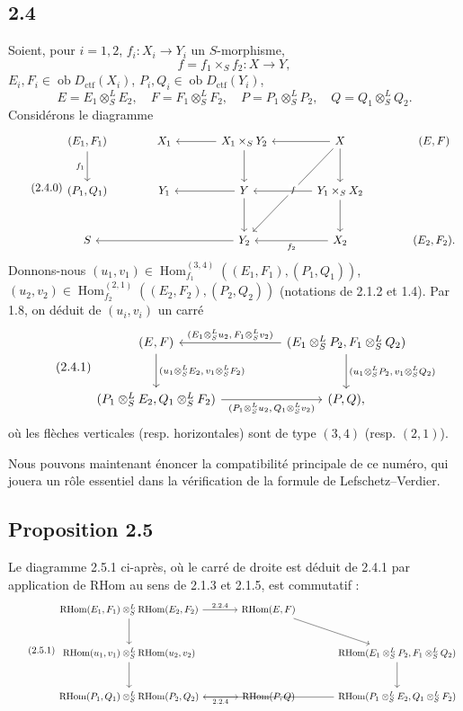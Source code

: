 \documentclass[11pt]{article}
\DeclareMathOperator{\Hom}{Hom}
\newcommand{\ob}{\operatorname{ob}}
\providecommand{\RHom}{\mathrm{RHom}}
\providecommand{\ctf}{\mathrm{ctf}}
\providecommand{\RHom}{\mathrm{RHom}}
\providecommand{\Hom}{\operatorname{Hom}}
\providecommand{\ob}{\operatorname{ob}}
\providecommand{\RHom}{\mathrm R\mathcal{H}om}
\providecommand{\RHom}{\mathrm{RHom}}
\providecommand{\Hom}{\operatorname{Hom}}
\begin{document}
\subsection*{2.4}
Soient, pour $i=1,2$, $f_i:X_i\to Y_i$ un $S$-morphisme,
\[
f=f_1\times_S f_2:X\to Y,
\]
$E_i,F_i\in\ob D_{\ctf}(X_i)$, $P_i,Q_i\in\ob D_{\ctf}(Y_i)$,
\[
E=E_1\otimes^{L}_{S}E_2,
\quad F=F_1\otimes^{L}_{S}F_2,
\quad P=P_1\otimes^{L}_{S}P_2,
\quad Q=Q_1\otimes^{L}_{S}Q_2.
\]
Considérons le diagramme
\begin{equation}\tag{2.4.0}
\begin{tikzcd}[column sep=large,row sep=large]
(E_1,F_1) \arrow[d,"f_1"'] & X_1 & X_1\times_SY_2 \arrow[l] \arrow[d] & X \arrow[l] \arrow[d] \arrow[ddl,"f" description] & (E,F)\\
(P_1,Q_1) & Y_1 & Y \arrow[l] \arrow[d] & Y_1\times_SX_2 \arrow[l] \arrow[d] \\
S & & Y_2 \arrow[ll] & X_2 \arrow[l,"f_2"] & (E_2,F_2).
\end{tikzcd}
\end{equation}
Donnons-nous $(u_1,v_1)\in\Hom_{f_1}^{(3,4)}((E_1,F_1),(P_1,Q_1))$, $(u_2,v_2)\in\Hom_{f_2}^{(2,1)}((E_2,F_2),(P_2,Q_2))$ (notations de 2.1.2 et 1.4). Par 1.8, on déduit de $(u_i,v_i)$ un carré
\begin{equation}\tag{2.4.1}
\begin{tikzcd}[column sep=huge,row sep=large]
(E,F) \arrow[d,"{(u_1\otimes^L_S E_2,\,v_1\otimes^L_S F_2)}"] & (E_1\otimes^L_S P_2,F_1\otimes^L_S Q_2) \arrow[l,"{(E_1\otimes^L_S u_2,\,F_1\otimes^L_S v_2)}"'] \arrow[d,"{(u_1\otimes^L_S P_2,\,v_1\otimes^L_S Q_2)}"]\\
(P_1\otimes^L_S E_2,Q_1\otimes^L_S F_2) \arrow[r,"{(P_1\otimes^L_S u_2,\,Q_1\otimes^L_S v_2)}"'] & (P,Q),
\end{tikzcd}
\end{equation}
où les flèches verticales (resp. horizontales) sont de type $(3,4)$ (resp. $(2,1)$).

Nous pouvons maintenant énoncer la compatibilité principale de ce numéro, qui jouera un rôle essentiel dans la vérification de la formule de Lefschetz--Verdier.

\subsection*{Proposition 2.5}
Le diagramme 2.5.1 ci-après, où le carré de droite est déduit de 2.4.1 par application de $\RHom$ au sens de 2.1.3 et 2.1.5, est commutatif :
\begin{equation}\tag{2.5.1}
\begin{tikzcd}[column sep=large,row sep=large]
\RHom(E_1,F_1)\otimes^L_S\RHom(E_2,F_2) \arrow[r,"2.2.4"] \arrow[d] & \RHom(E,F) \arrow[dr] \\
\RHom(u_1,v_1)\otimes^L_S\RHom(u_2,v_2) \arrow[d] & & \RHom(E_1\otimes^L_SP_2,F_1\otimes^L_SQ_2) \arrow[d]\\
\RHom(P_1,Q_1)\otimes^L_S\RHom(P_2,Q_2) \arrow[r,"2.2.4"'] & \RHom(P,Q) & \RHom(P_1\otimes^L_SE_2,Q_1\otimes^L_SF_2) \arrow[ll]
\end{tikzcd}
\end{equation}
\end{document}
